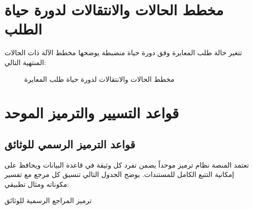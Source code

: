 \documentclass{bts-report-ar}
\begin{document}
\section{مخطط الحالات والانتقالات لدورة حياة الطلب}
تتغير حالة طلب المعايرة وفق دورة حياة منضبطة يوضحها مخطط الآلة ذات الحالات المنتهية التالي:

\begin{figure}[H]
  \centering
  \begin{LTR}
  
  \end{LTR}
  \caption{مخطط الحالات والانتقالات لدورة حياة طلب المعايرة}
  \label{fig:state-request}
\end{figure}

\section{قواعد التسيير والترميز الموحد}
\subsection{قواعد الترميز الرسمي للوثائق}
تعتمد المنصة نظام ترميز موحداً يضمن تفرد كل وثيقة في قاعدة البيانات ويحافظ على إمكانية التتبع الكامل للمستندات. يوضح الجدول التالي تنسيق كل مرجع مع تفسير مكوناته ومثال تطبيقي:

\begin{codiftablear}{ترميز المراجع الرسمية للوثائق}
\end{codiftablear}
\end{document}
